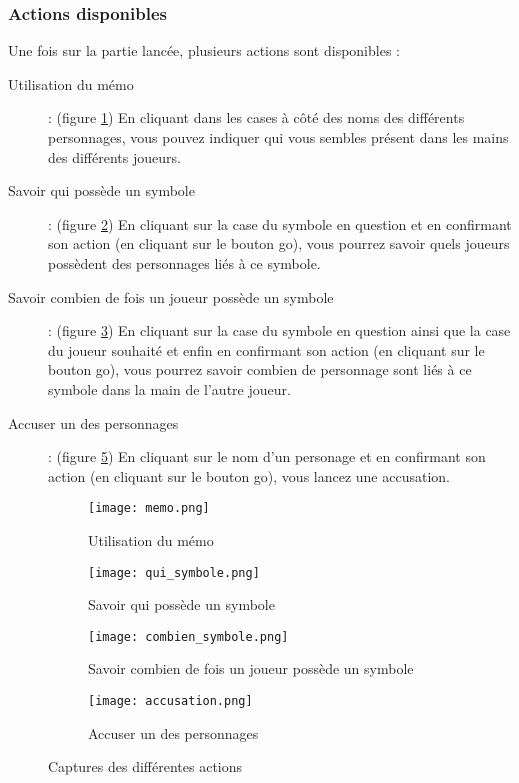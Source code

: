 \subsubsection{Actions disponibles}

Une fois sur la partie lancée, plusieurs actions sont disponibles :
\begin{description}
  \item[Utilisation du mémo] : (figure \ref{fig:memo}) En cliquant dans les cases à côté des noms des différents personnages, vous pouvez indiquer qui vous sembles présent dans les mains des différents joueurs.
  \item[Savoir qui possède un symbole] : (figure \ref{fig:qui_symbole}) En cliquant sur la case du symbole en question et en confirmant son action (en cliquant sur le bouton go), vous pourrez savoir quels joueurs possèdent des personnages liés à ce symbole.
  \item[Savoir combien de fois un joueur possède un symbole] : (figure \ref{fig:combien_symbole}) En cliquant sur la case du symbole en question ainsi que la case du joueur souhaité et enfin en confirmant son action (en cliquant sur le bouton go), vous pourrez savoir combien de personnage sont liés à ce symbole dans la main de l'autre joueur.
  \item[Accuser un des personnages] : (figure \ref{fig:accusation}) En cliquant sur le nom d'un personage et en confirmant son action (en cliquant sur le bouton go), vous lancez une accusation.
\end{description}

\begin{figure}[H]
     \centering
     \begin{subfigure}{.45\linewidth}
       \centering
           \texttt{[image: memo.png]}
       \caption{Utilisation du mémo}
       \label{fig:memo}
     \end{subfigure}
     \hspace{1em}
     \begin{subfigure}{.45\linewidth}
	  \centering
       \texttt{[image: qui\_symbole.png]}
       \caption{Savoir qui possède un symbole}
       \label{fig:qui_symbole}
     \end{subfigure}
     \hspace{1em}
     \begin{subfigure}{.45\linewidth}
         \centering
         \texttt{[image: combien\_symbole.png]}
        \caption{Savoir combien de fois un joueur possède un symbole}
       \label{fig:combien_symbole}
     \end{subfigure}
     \hspace{1em}
     \begin{subfigure}{.45\linewidth}
	 \centering
           \texttt{[image: accusation.png]}
      	   \caption{Accuser un des personnages}
       \label{fig:accusation}
     \end{subfigure}
     \caption{Captures des différentes actions} 
\end{figure}

